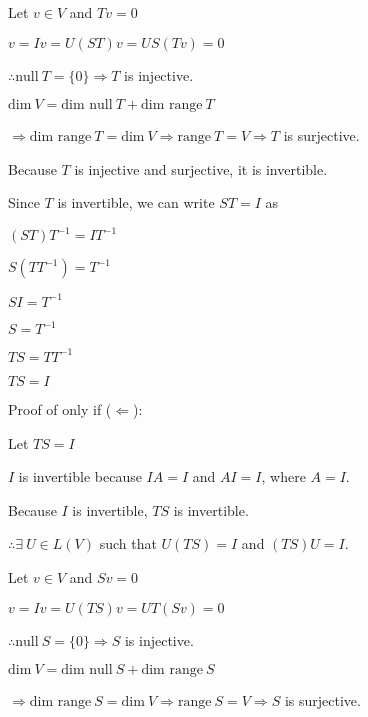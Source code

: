 \documentclass[fleqn]{article}
\begin{document}
\begin{enumerate}[nolistsep]
	Let $v \in V$ and $Tv = 0$
	
	$v = Iv = U(ST)v = US(Tv) = 0$
	
	$\therefore \text{null}\ T = \{0\} \Rightarrow T$ is injective.
	
	$\text{dim}\ V = \text{dim null}\ T + \text{dim range}\ T$
	
	$\Rightarrow \text{dim range}\ T = \text{dim}\ V \Rightarrow \text{range}\ T = V \Rightarrow T$ is surjective. 
	
	Because $T$ is injective and surjective, it is invertible.
	
	
	
	
	
	
	
	
	
	Since $T$ is invertible, we can write $ST = I$ as
	
	$(ST)T^{-1} = IT^{-1}$
	
	$S(TT^{-1}) = T^{-1}$
	
	$SI = T^{-1}$
	
	$S = T^{-1}$
	
	$TS = TT^{-1}$
	
	$TS = I$
	
	Proof of only if ($\Leftarrow$):
	
	Let $TS = I$
	
	$I$ is invertible because $IA = I$ and $AI = I$, where $A = I$.
	
	Because $I$ is invertible, $TS$ is invertible.
	
	$\therefore \exists\ U \in L(V)$ such that $U(TS) = I$ and $(TS)U = I$.
	
	Let $v \in V$ and $Sv = 0$
	
	$v = Iv = U(TS)v = UT(Sv) = 0$
	
	$\therefore \text{null}\ S = \{0\} \Rightarrow S$ is injective.
	
	$\text{dim}\ V = \text{dim null}\ S + \text{dim range}\ S$
	
	$\Rightarrow \text{dim range}\ S = \text{dim}\ V \Rightarrow \text{range}\ S = V \Rightarrow S$ is surjective.
	

\end{enumerate}
\end{document}
